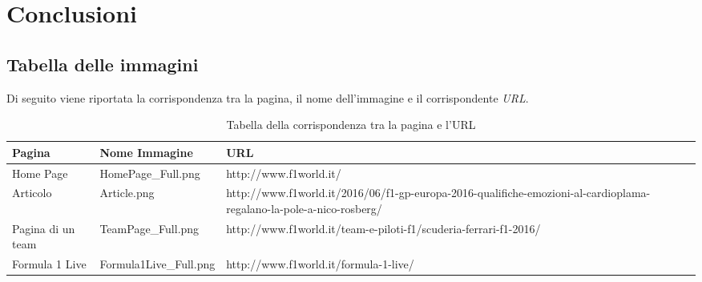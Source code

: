 \section{Conclusioni}
\subsection{Tabella delle immagini}

Di seguito viene riportata la corrispondenza tra la pagina, il nome
dell'immagine e il corrispondente \textit{URL}.

\begin{center}
  \begin{table}[H]
    \centering
    \begin{tabular}{| p{3cm} | p{4cm} | p{8cm} |}
      \hline
      \textbf{Pagina} & \textbf{Nome Immagine} & \textbf{URL} \tabularnewline \hline
		Home Page         & HomePage\_Full.png     & http://www.f1world.it/ \tabularnewline \hline
		Articolo          & Article.png            & http://www.f1world.it/2016/06/f1-gp-europa-2016-qualifiche-emozioni-al-cardioplama-regalano-la-pole-a-nico-rosberg/  \tabularnewline \hline
		Pagina di un team & TeamPage\_Full.png     & http://www.f1world.it/team-e-piloti-f1/scuderia-ferrari-f1-2016/  \tabularnewline \hline
		Formula 1 Live    & Formula1Live\_Full.png & http://www.f1world.it/formula-1-live/ \tabularnewline \hline
    \end{tabular}
    \caption{Tabella della corrispondenza tra la pagina e l'URL}
  \end{table}
\end{center}
